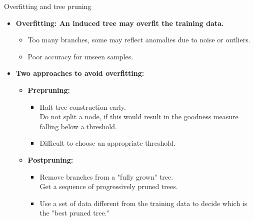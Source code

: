\documentclass[aspectratio=169,t,table]{beamer}
\begin{document}
  {
    \begin{frame}{Overfitting and tree pruning}
      \begin{itemize}
        \item \textbf{Overfitting: An induced tree may overfit the training data.}
        \begin{itemize}
          \item Too many branches, some may reflect anomalies due to noise or outliers.
          \item Poor accuracy for unseen samples.
        \end{itemize}
        \item \textbf{Two approaches to avoid overfitting:}
        \begin{itemize}
          \item \textbf{\color{airforceblue}Prepruning:}
          \begin{itemize}
            \item Halt tree construction early.\\
                  Do not split a node, if this would result in the goodness measure falling below a threshold.
            \item Difficult to choose an appropriate threshold.
          \end{itemize}
          \item \textbf{\color{airforceblue}Postpruning:}
          \begin{itemize}
            \item Remove branches from a "fully grown" tree.\\
                  Get a sequence of progressively pruned trees.
            \item Use a set of data different from the training data to decide which is the "best pruned tree."
          \end{itemize}
        \end{itemize}
      \end{itemize}
    \end{frame}
  }
\end{document}
